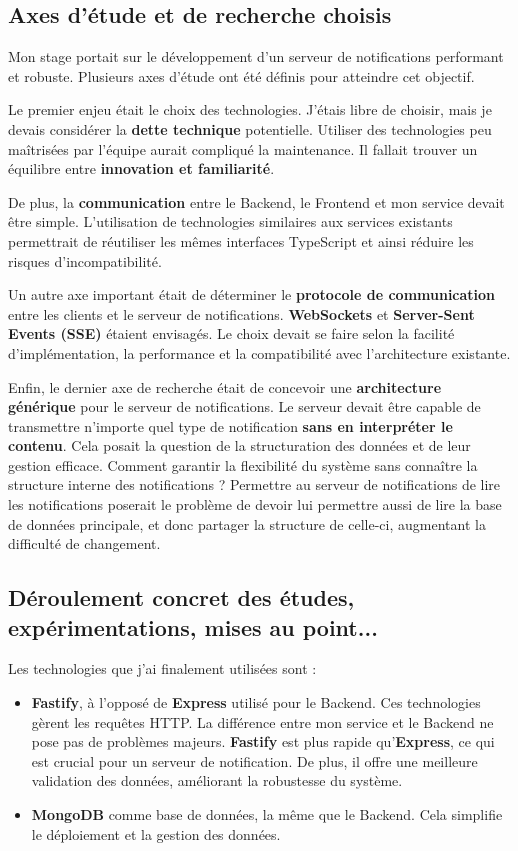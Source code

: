 \subsection{Axes d'étude et de recherche choisis}

Mon stage portait sur le développement d'un serveur de notifications performant
et robuste. Plusieurs axes d'étude ont été définis pour atteindre cet objectif.

Le premier enjeu était le choix des technologies. J'étais libre de choisir,
mais je devais considérer la {\bf dette technique} potentielle. Utiliser des
technologies peu maîtrisées par l'équipe aurait compliqué la maintenance. Il
fallait trouver un équilibre entre {\bf innovation et familiarité}.

De plus, la {\bf communication} entre le Backend, le Frontend et mon service
devait être simple. L'utilisation de technologies similaires aux services
existants permettrait de réutiliser les mêmes interfaces TypeScript et ainsi
réduire les risques d'incompatibilité.

Un autre axe important était de déterminer le {\bf protocole de communication}
entre les clients et le serveur de notifications. {\bf WebSockets} et
{\bf Server-Sent Events (SSE)} étaient envisagés. Le choix devait se faire
selon la facilité d'implémentation, la performance et la compatibilité avec
l'architecture existante.

Enfin, le dernier axe de recherche était de concevoir une {\bf architecture
générique} pour le serveur de notifications. Le serveur devait être capable
de transmettre n'importe quel type de notification {\bf sans en interpréter le
contenu}. Cela posait la question de la structuration des données et de leur
gestion efficace. Comment garantir la flexibilité du système sans connaître la
structure interne des notifications ? Permettre au serveur de notifications de
lire les notifications poserait le problème de devoir lui permettre aussi de
lire la base de données principale, et donc partager la structure de celle-ci,
augmentant la difficulté de changement.

\subsection{Déroulement concret des études, expérimentations, mises au point...}

Les technologies que j'ai finalement utilisées sont :

\begin{itemize}
	\item {\bf Fastify}, à l'opposé de {\bf Express} utilisé pour le Backend. Ces technologies
gèrent les requêtes HTTP. La différence entre mon service et le Backend ne pose
pas de problèmes majeurs.
{\bf Fastify} est plus rapide qu'{\bf Express}, ce qui est crucial pour un serveur de
notification. De plus, il offre une meilleure validation des données, améliorant
la robustesse du système.
	\item {\bf MongoDB} comme base de données, la même que le Backend. Cela simplifie le
déploiement et la gestion des données.
\end{itemize}

